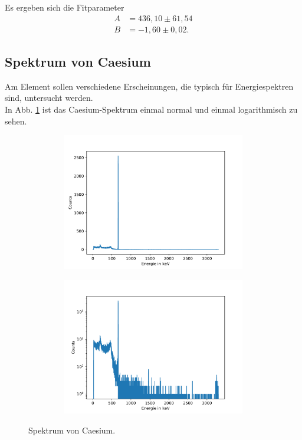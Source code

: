     Es ergeben sich die Fitparameter
    \begin{align*}
      A &= 436,10\pm 61,54\\
      B &= -1,60\pm 0,02.
    \end{align*}




  \subsection{Spektrum von Caesium}

    Am Element  sollen verschiedene Erscheinungen, die
    typisch für Energiespektren sind, untersucht werden.\\

    In Abb. \ref{fig:cas} ist das Caesium-Spektrum einmal
    normal und einmal logarithmisch zu sehen.

    \begin{figure}[H]
      \centering
      \begin{subfigure}{0.495\textwidth}
        \centering
        \includegraphics[height=6cm, width = 1\textwidth]{germanib/cs_allgemein/casenergie.pdf}
      \end{subfigure}
      \begin{subfigure}{0.495\textwidth}
        \centering
        \includegraphics[height=6cm, width = 1\textwidth]{germanib/cs_allgemein/casenergielog.pdf}
      \end{subfigure}
      \caption{Spektrum von Caesium.}
      \label{fig:cas}
    \end{figure}


